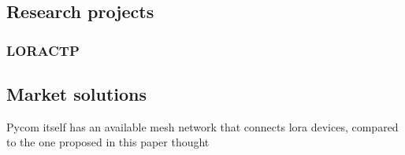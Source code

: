 		
		\subsection{Research projects}
		
			
			
			
			\subsubsection{LORACTP}
			
		
		\subsection{Market solutions}
		
		
		
			Pycom itself has an available mesh network that connects lora devices, compared to the one proposed in this paper thought
			

